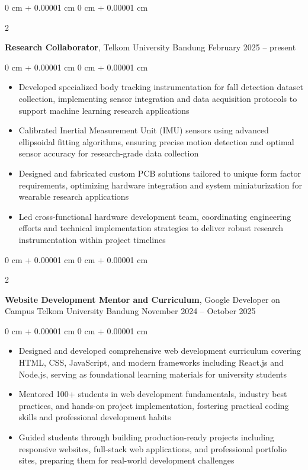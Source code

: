 \documentclass[10pt, a4paper]{article}
\newenvironment{highlights}{
    \begin{itemize}[
        topsep=0.10 cm,
        parsep=0.10 cm,
        partopsep=0pt,
        itemsep=0pt,
        leftmargin=0 cm + 10pt
    ]
}{
    \end{itemize}
} %
\newenvironment{onecolentry}{
    \begin{adjustwidth}{
        0 cm + 0.00001 cm
    }{
        0 cm + 0.00001 cm
    }
}{
    \end{adjustwidth}
} %
\newenvironment{twocolentry}[2][]{
    \onecolentry
    \def\secondColumn{#2}
    \setcolumnwidth{\fill, 4.5 cm}
    \begin{paracol}{2}
}{
    \switchcolumn \raggedleft \secondColumn
    \end{paracol}
    \endonecolentry
} %
\begin{document}
        \begin{twocolentry}{
            February 2025 – present
        }
            \textbf{Research Collaborator}, Telkom University Bandung\end{twocolentry}

        \vspace{0.10 cm}
        \begin{onecolentry}
            \begin{highlights}
                \item Developed specialized body tracking instrumentation for fall detection dataset collection, implementing sensor integration and data acquisition protocols to support machine learning research applications
                \item Calibrated Inertial Measurement Unit (IMU) sensors using advanced ellipsoidal fitting algorithms, ensuring precise motion detection and optimal sensor accuracy for research-grade data collection
                \item Designed and fabricated custom PCB solutions tailored to unique form factor requirements, optimizing hardware integration and system miniaturization for wearable research applications
                \item Led cross-functional hardware development team, coordinating engineering efforts and technical implementation strategies to deliver robust research instrumentation within project timelines
            \end{highlights}
        \end{onecolentry}


        \vspace{0.2 cm}


      \begin{twocolentry}{
            November 2024 – October 2025
        }
            \textbf{Website Development Mentor and Curriculum}, Google Developer on Campus Telkom University Bandung\end{twocolentry}

        \vspace{0.10 cm}
        \begin{onecolentry}
            \begin{highlights}
                \item Designed and developed comprehensive web development curriculum covering HTML, CSS, JavaScript, and modern frameworks including React.js and Node.js, serving as foundational learning materials for university students
                \item Mentored 100+ students in web development fundamentals, industry best practices, and hands-on project implementation, fostering practical coding skills and professional development habits
                \item Guided students through building production-ready projects including responsive websites, full-stack web applications, and professional portfolio sites, preparing them for real-world development challenges
            \end{highlights}
        \end{onecolentry}
\end{document}
